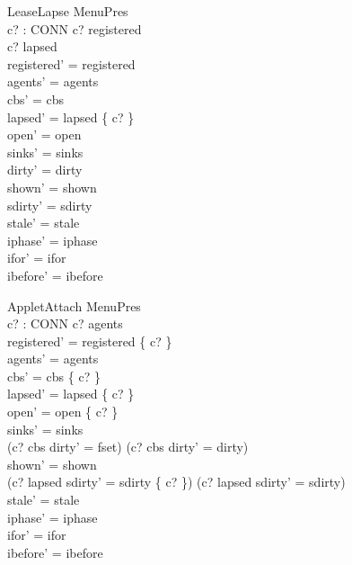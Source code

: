 \documentclass[a4paper,10pt,fleqn]{article}
\begin{document}
\begin{schema}{LeaseLapse}
  \Delta MenuPres \\
  c? : CONN
\where
  c? \in registered \\
  c? \notin lapsed \\
  registered' = registered \\
  agents' = agents \\
  cbs' = cbs \\
  lapsed' = lapsed \cup \{ c? \} \\
  open' = open \\
  sinks' = sinks \\
  dirty' = dirty \\
  shown' = shown \\
  sdirty' = sdirty \\
  stale' = stale \\
  iphase' = iphase \\
  ifor' = ifor \\
  ibefore' = ibefore
\end{schema}

\begin{schema}{AppletAttach}
  \Delta MenuPres \\
  c? : CONN
\where
  c? \notin agents \\
  registered' = registered \cup \{ c? \} \\
  agents' = agents \\
  cbs' = cbs \setminus \{ c? \} \\
  lapsed' = lapsed \setminus \{ c? \} \\
  open' = open \cup \{ c? \} \\
  sinks' = sinks \\
  (c? \in cbs \land dirty' = fset) \lor (c? \notin cbs \land dirty' = dirty) \\
  shown' = shown \\
  (c? \in lapsed \land sdirty' = sdirty \cup \{ c? \}) \lor
    (c? \notin lapsed \land sdirty' = sdirty) \\
  stale' = stale \\
  iphase' = iphase \\
  ifor' = ifor \\
  ibefore' = ibefore
\end{schema}
\end{document}
